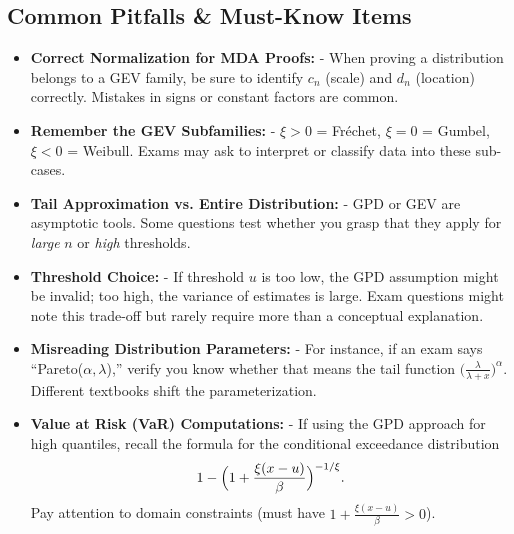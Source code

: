 \documentclass[13pt,a4paper]{article}
\begin{document}
\subsection{Common Pitfalls \& Must-Know Items}
\begin{itemize}
  \item \textbf{Correct Normalization for MDA Proofs:}
    - When proving a distribution belongs to a GEV family, be sure to identify \(c_n\) (scale) and \(d_n\) (location) correctly. Mistakes in signs or constant factors are common.
  \item \textbf{Remember the GEV Subfamilies:}
    - \(\xi>0\) = Fréchet, \(\xi=0\) = Gumbel, \(\xi<0\) = Weibull. Exams may ask to interpret or classify data into these sub-cases.
  \item \textbf{Tail Approximation vs. Entire Distribution:}
    - GPD or GEV are asymptotic tools. Some questions test whether you grasp that they apply for \emph{large} \(n\) or \emph{high} thresholds.
  \item \textbf{Threshold Choice:}
    - If threshold \(u\) is too low, the GPD assumption might be invalid; too high, the variance of estimates is large. Exam questions might note this trade-off but rarely require more than a conceptual explanation.
  \item \textbf{Misreading Distribution Parameters:}
    - For instance, if an exam says “Pareto(\(\alpha,\lambda\)),” verify you know whether that means the tail function \(\bigl(\frac{\lambda}{\lambda+x}\bigr)^\alpha\). Different textbooks shift the parameterization.
  \item \textbf{Value at Risk (VaR) Computations:}
    - If using the GPD approach for high quantiles, recall the formula for the conditional exceedance distribution 
      \[
        1 - \Bigl(1+\frac{\xi(x-u)}{\beta}\Bigr)^{-1/\xi}.
      \]
      Pay attention to domain constraints (must have \(1 + \frac{\xi(x-u)}{\beta}>0\)).
\end{itemize}
\end{document}
